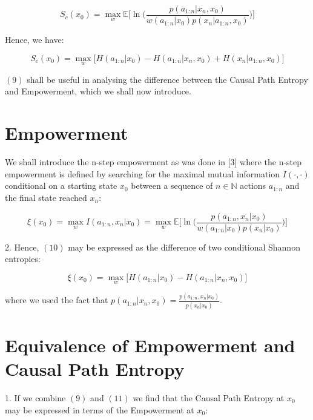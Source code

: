 \documentclass{article}
\begin{document}
\begin{equation}
S_c(x_0) = \max\limits_{w} \mathbb{E} \big[ \ln \big( \frac{p(a_{1:n}|x_n,x_0)}{w(a_{1:n}|x_0)p(x_n|a_{1:n},x_0)}\big)\big]
\end{equation}

Hence, we have:

\begin{equation}
S_c(x_0) = \max\limits_{w} \big[H(a_{1:n}|x_0)-H(a_{1:n}|x_n,x_0) +H(x_n|a_{1:n},x_0)\big]
\end{equation}

$(9)$ shall be useful in analysing the difference between the Causal Path Entropy and Empowerment, which we shall now introduce.  



\section{Empowerment}

We shall introduce the n-step empowerment as was done in [3] where the n-step empowerment is defined by searching for the maximal mutual information $I(\cdot,\cdot)$ conditional on a starting state $x_0$ between a sequence of $n \in \mathbb{N}$ actions $a_{1:n}$ and the final state reached $x_n$:

\begin{equation}
\xi(x_0) = \max\limits_{w} I(a_{1:n},x_n|x_0)=\max\limits_{w} \mathbb{E}  \big[ \ln \big( \frac{p(a_{1:n},x_n|x_0)}{w(a_{1:n}|x_0)p(x_n|x_0)}\big)\big]
\end{equation}

2. Hence, $(10)$ may be expressed as the difference of two conditional Shannon entropies:

\begin{equation}
\xi(x_0) = \max\limits_{w} \big[H(a_{1:n}|x_0)-H(a_{1:n}|x_n,x_0) \big]
\end{equation}

where we used the fact that $p(a_{1:n}|x_n,x_0)=\frac{p(a_{1:n},x_n|x_0)}{p(x_n|x_0)}$.

\newpage

\section{Equivalence of Empowerment and Causal Path Entropy}

1. If we combine $(9)$ and $(11)$ we find that the Causal Path Entropy at $x_0$ may be expressed in terms of the Empowerment at $x_0$:
\end{document}
